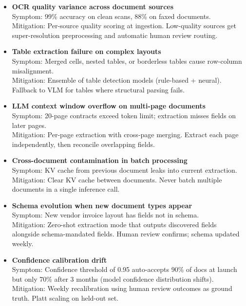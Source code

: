 \begin{itemize}
  \item \textbf{OCR quality variance across document sources}\\
    Symptom: 99\% accuracy on clean scans, 88\% on faxed documents.\\
    Mitigation: Per-source quality scoring at ingestion. Low-quality sources get super-resolution preprocessing and automatic human review routing.

  \item \textbf{Table extraction failure on complex layouts}\\
    Symptom: Merged cells, nested tables, or borderless tables cause row-column misalignment.\\
    Mitigation: Ensemble of table detection models (rule-based + neural). Fallback to VLM for tables where structural parsing fails.

  \item \textbf{LLM context window overflow on multi-page documents}\\
    Symptom: 20-page contracts exceed token limit; extraction misses fields on later pages.\\
    Mitigation: Per-page extraction with cross-page merging. Extract each page independently, then reconcile overlapping fields.

  \item \textbf{Cross-document contamination in batch processing}\\
    Symptom: KV cache from previous document leaks into current extraction.\\
    Mitigation: Clear KV cache between documents. Never batch multiple documents in a single inference call.

  \item \textbf{Schema evolution when new document types appear}\\
    Symptom: New vendor invoice layout has fields not in schema.\\
    Mitigation: Zero-shot extraction mode that outputs discovered fields alongside schema-mandated fields. Human review confirms; schema updated weekly.

  \item \textbf{Confidence calibration drift}\\
    Symptom: Confidence threshold of 0.95 auto-accepts 90\% of docs at launch but only 70\% after 3 months (model confidence distribution shifts).\\
    Mitigation: Weekly recalibration using human review outcomes as ground truth. Platt scaling on held-out set.
\end{itemize}

